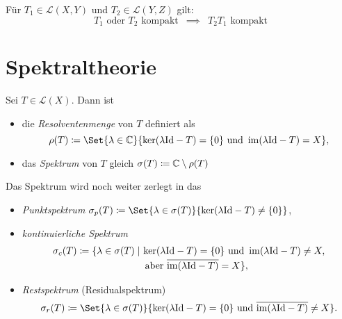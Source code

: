 \documentclass{cheat-sheet}
\newcommand{\LSO}{\mathcal{L}} %
\begin{document}
\begin{lem}
  Für $T_1 \in \LSO(X, Y)$ und $T_2 \in \LSO(Y, Z)$ gilt:
  \[
    \text{$T_1$ oder $T_2$ kompakt}
    \enspace \implies \enspace
    \text{$T_2 T_1$ kompakt}
  \]
\end{lem}

\iffalse
\begin{bspe}
  \begin{itemize}
    \item Sei $\Omega \opn \R^n$, beschränkt mit $\mathcal{C}^{0,1}$-Rand. Seien $m_1 > m_2 \in \N$ und $1 \leq p_1, p_2 < \infty$ sowie $m_1 - \tfrac{n}{p_1} > m_2 - \tfrac{n}{p_2}$. Dann ist die Einbettung $\Id : W^{m_1,p_1}(\Omega) \to W^{m_2,p_2}(\Omega)$ stetig und kompakt.
    \item Viele Integraloperatoren, vgl. z.\,B. ÜA24
  \end{itemize}
\end{bspe}
\fi

\section{Spektraltheorie}


\begin{defn}
  Sei $T \in \LSO(X)$. Dann ist
  \begin{itemize}
    \item die \emph{Resolventenmenge} von $T$ definiert als
    \[ \rho(T) \coloneqq \Set{ \lambda \in \C }{ \ker (\lambda \Id - T) = \{ 0 \} \text{ und } \im (\lambda \Id - T) = X }, \]
    \item das \emph{Spektrum} von $T$ gleich $\sigma(T) \coloneqq \mathbb{C} \setminus \rho(T)$
  \end{itemize}
  Das Spektrum wird noch weiter zerlegt in das
  \begin{itemize}
    \item \emph{Punktspektrum} $\sigma_p(T) \coloneqq \Set{ \lambda \in \sigma(T) }{ \ker(\lambda \Id - T) \not= \{ 0 \} }$,
    \item \emph{kontinuierliche Spektrum}
    \begin{align*}
      \sigma_c(T) \coloneqq \{ \lambda \in \sigma(T) \mid\, &\ker(\lambda \mathrm{Id} - T) = \{ 0 \} \text{ und } \mathop{\mathrm{im}} (\lambda \mathrm{Id} - T) \not= X,\\[-2pt]
      &\text{ aber } \overline{\mathop{\mathrm{im}} (\lambda \mathrm{Id} - T)} = X \},
    \end{align*}
    \item \emph{Restspektrum} (Residualspektrum)
    \[ \sigma_r(T) \coloneqq \Set{ \lambda \in \sigma(T) }{ \ker(\lambda \Id - T) = \{ 0 \} \text{ und } \overline{\im(\lambda \Id - T)} \not= X }. \]
  \end{itemize}
\end{defn}
\end{document}
